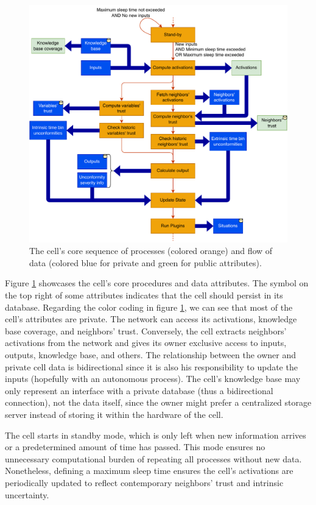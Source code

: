 \begin{figure}[h!]
    \centering
    \includegraphics[width=\textwidth]{figures/chapter4/cell/processes.pdf}
    \caption{The cell's core sequence of processes (colored orange) and flow of data (colored blue for private and green for public attributes).}
    \label{fig:cellprocesses}
\end{figure}

Figure \ref{fig:cellprocesses} showcases the cell's core procedures and data attributes. The symbol on the top right of some attributes indicates that the cell should persist in its database. Regarding the color coding in figure \ref{fig:cellprocesses}, we can see that most of the cell's attributes are private. The network can access its activations, knowledge base coverage, and neighbors' trust. Conversely, the cell extracts neighbors' activations from the network and gives its owner exclusive access to inputs, outputs, knowledge base, and others. The relationship between the owner and private cell data is bidirectional since it is also his responsibility to update the inputs (hopefully with an autonomous process). The cell's knowledge base may only represent an interface with a private database (thus a bidirectional connection), not the data itself, since the owner might prefer a centralized storage server instead of storing it within the hardware of the cell.

The cell starts in standby mode, which is only left when new information arrives or a predetermined amount of time has passed. This mode ensures no unnecessary computational burden of repeating all processes without new data. Nonetheless, defining a maximum sleep time ensures the cell's activations are periodically updated to reflect contemporary neighbors' trust and intrinsic uncertainty.

